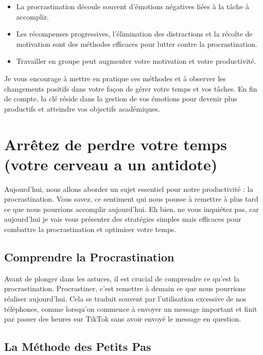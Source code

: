 \documentclass[a4paper, 10pt, garamond]{book}
\begin{document}
\begin{itemize}
	\item La procrastination découle souvent d'émotions négatives liées à la
	      tâche à accomplir.
	\item Les récompenses progressives, l'élimination des distractions et la
	      récolte de motivation sont des méthodes efficaces pour lutter contre la
	      procrastination.
	\item Travailler en groupe peut augmenter votre motivation et votre
	      productivité.
\end{itemize}

Je vous encourage à mettre en pratique ces méthodes et à observer les changements
positifs dans votre façon de gérer votre temps et vos tâches. En fin de compte,
la clé réside dans la gestion de vos émotions pour devenir plus productifs et
atteindre vos objectifs académiques.


\chapter{Arrêtez de perdre votre temps (votre cerveau a un antidote)}


Aujourd'hui, nous allons aborder un sujet essentiel pour notre productivité :
la procrastination. Vous savez, ce sentiment qui nous pousse à remettre à plus
tard ce que nous pourrions accomplir aujourd'hui. Eh bien, ne vous inquiétez
pas, car aujourd'hui je vais vous présenter des stratégies simples mais
efficaces pour combattre la procrastination et optimiser votre temps.

\section{Comprendre la Procrastination}

Avant de plonger dans les astuces, il est crucial de comprendre ce qu'est la
procrastination. Procrastiner, c'est remettre à demain ce que nous pourrions
réaliser aujourd'hui. Cela se traduit souvent par l'utilisation excessive de
nos téléphones, comme lorsqu'on commence à envoyer un message important et
finit par passer des heures sur TikTok sans avoir envoyé le message en
question.

\section{La Méthode des Petits Pas}
\end{document}
